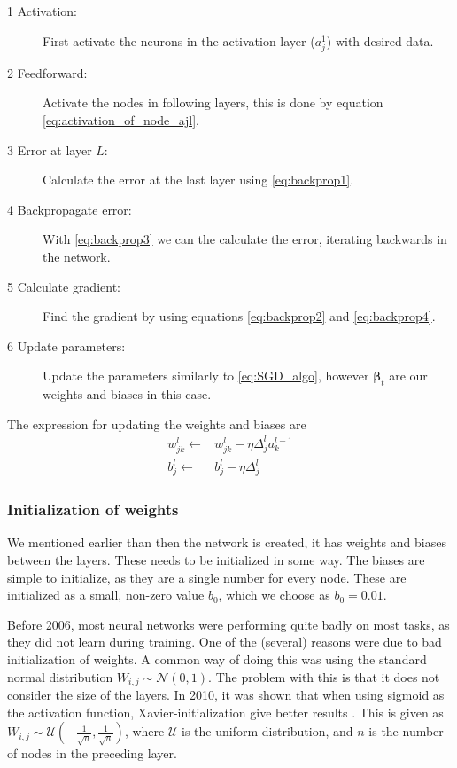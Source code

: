 \documentclass[12pt]{extarticle}
\begin{document}
\begin{description}
	\item[1 Activation:] First activate the neurons in the activation layer ($a^1_j$) with desired data.
	\item[2 Feedforward:] Activate the nodes in following layers, this is done by equation \eqref{eq:activation_of_node_ajl}.
	\item[3 Error at layer $L$:] Calculate the error at the last layer using \eqref{eq:backprop1}.
	\item[4 Backpropagate error:] With \eqref{eq:backprop3} we can the calculate the error, iterating backwards in the network.
	\item[5 Calculate gradient:] Find the gradient by using equations \eqref{eq:backprop2} and \eqref{eq:backprop4}.
	\item[6 Update parameters:] Update the parameters similarly to \eqref{eq:SGD_algo}, however $\boldsymbol{\beta}_t$ are our weights and biases in this case.
\end{description}

The expression for updating the weights and biases are
\begin{align}
	w_{jk}^l \leftarrow & w_{jk}^l - \eta \Delta_j^l a_k^{l-1} \label{eq:update_weights} \\
	b_j^l \leftarrow    & b_j^l - \eta \Delta_j^l \label{eq:update_biases}
\end{align}

\subsubsection{Initialization of weights} \label{sec:wi}
We mentioned earlier than then the network is created, it has weights and biases between the layers. These needs to be initialized in some way. The biases are simple to initialize, as they are a single number for every node. These are initialized as a small, non-zero value $b_0$, which we choose as $b_0=0.01$.

Before 2006, most neural networks were performing quite badly on most tasks, as they did not learn during training. One of the (several) reasons were due to bad initialization of weights. A common way of doing this was using the standard normal distribution $W_{i,j} \sim  \mathcal{N}(0, 1)$. The problem with this is that it does not consider the size of the layers. In 2010, it was shown that when using sigmoid as the activation function, Xavier-initialization give better results \cite{xavier}. This is given as $W_{i, j}\sim\mathcal{U} \left(-\frac{1}{\sqrt{n}}, \frac{1}{\sqrt{n}} \right)$, where $\mathcal{U}$ is the uniform distribution, and $n$ is the number of nodes in the preceding layer.
\end{document}
